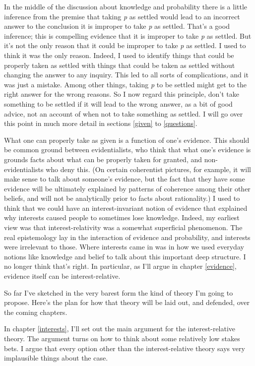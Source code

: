 \documentclass[
  11pt,
]{book}
\begin{document}
In the middle of the discussion about knowledge and probability there is a little inference from the premise that taking \emph{p} as settled would lead to an incorrect answer to the conclusion it is improper to take \emph{p} as settled. That's a good inference; this is compelling evidence that it is improper to take \emph{p} as settled. But it's not the only reason that it could be improper to take \emph{p} as settled. I used to think it was the only reason. Indeed, I used to identify things that could be properly taken as settled with things that could be taken as settled without changing the answer to any inquiry. This led to all sorts of complications, and it was just a mistake. Among other things, taking \emph{p} to be settled might get to the right answer for the wrong reasons. So I now regard this principle, don't take something to be settled if it will lead to the wrong answer, as a bit of good advice, not an account of when not to take something as settled. I will go over this point in much more detail in sections \ref{given} to \ref{questions}.

What one can properly take as given is a function of one's evidence. This should be common ground between evidentialists, who think that what one's evidence is grounds facts about what can be properly taken for granted, and non-evidentialists who deny this. (On certain coherentist pictures, for example, it will make sense to talk about someone's evidence, but the fact that they have some evidence will be ultimately explained by patterns of coherence among their other beliefs, and will not be analytically prior to facts about rationality.) I used to think that we could have an interest-invariant notion of evidence that explained why interests caused people to sometimes lose knowledge. Indeed, my earliest view was that interest-relativity was a somewhat superficial phenomenon. The real epistemology lay in the interaction of evidence and probability, and interests were irrelevant to those. Where interests came in was in how we used everyday notions like knowledge and belief to talk about this important deep structure. I no longer think that's right. In particular, as I'll argue in chapter \ref{evidence}, evidence itself can be interest-relative.

So far I've sketched in the very barest form the kind of theory I'm going to propose. Here's the plan for how that theory will be laid out, and defended, over the coming chapters.

In chapter \ref{interests}, I'll set out the main argument for the interest-relative theory. The argument turns on how to think about some relatively low stakes bets. I argue that every option other than the interest-relative theory says very implausible things about the case.
\end{document}
